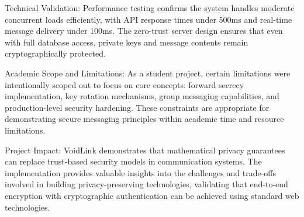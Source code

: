 \documentclass[12pt,a4paper,openany]{book}
\renewcommand{\headrulewidth}{0pt} %
\renewcommand{\footrulewidth}{0pt} %
\renewcommand{\headrulewidth}{0.4pt} %
\renewcommand{\headrulewidth}{0.4pt} %
\renewcommand{\headrulewidth}{0.4pt} %
\renewcommand{\headrulewidth}{0pt} %
\begin{document}
Technical Validation: Performance testing confirms the system handles moderate concurrent loads efficiently, with API response times under 500ms and real-time message delivery under 100ms. The zero-trust server design ensures that even with full database access, private keys and message contents remain cryptographically protected.

Academic Scope and Limitations: As a student project, certain limitations were intentionally scoped out to focus on core concepts: forward secrecy implementation, key rotation mechanisms, group messaging capabilities, and production-level security hardening. These constraints are appropriate for demonstrating secure messaging principles within academic time and resource limitations.

Project Impact: VoidLink demonstrates that mathematical privacy guarantees can replace trust-based security models in communication systems. The implementation provides valuable insights into the challenges and trade-offs involved in building privacy-preserving technologies, validating that end-to-end encryption with cryptographic authentication can be achieved using standard web technologies.

\newpage
\pagestyle{empty}  %
\renewcommand{\headrulewidth}{0pt}
\renewcommand{\footrulewidth}{0pt}

\renewcommand{\bibname}{Webography}
\end{document}
